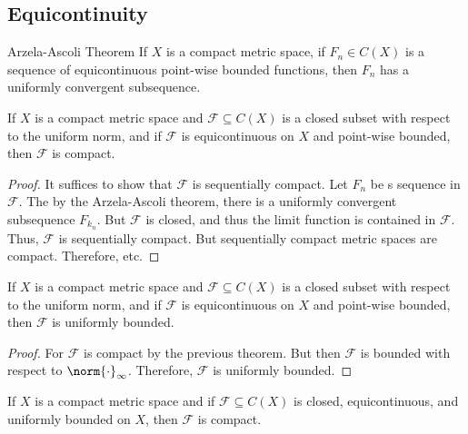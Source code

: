 \documentclass[crop=false,class=book,oneside]{standalone}
\begin{document}
        \subsection{Equicontinuity}
            \begin{ltheorem}{Arzela-Ascoli Theorem}
                If $X$ is a compact metric space, if
                $F_{n}\in{C}(X)$ is a sequence of equicontinuous
                point-wise bounded functions, then $F_{n}$ has a
                uniformly convergent subsequence.
            \end{ltheorem}
            \begin{theorem}
                If $X$ is a compact metric space and
                $\mathscr{F}\subseteq{C}(X)$ is a closed subset with
                respect to the uniform norm, and if
                $\mathscr{F}$ is equicontinuous on $X$ and point-wise
                bounded, then $\mathscr{F}$ is compact.
            \end{theorem}
            \begin{proof}
                It suffices to show that $\mathscr{F}$ is sequentially
                compact. Let $F_{n}$ be s sequence in $\mathscr{F}$.
                The by the Arzela-Ascoli theorem, there is a uniformly
                convergent subsequence $F_{k_{n}}$. But $\mathscr{F}$
                is closed, and thus the limit function is contained
                in $\mathscr{F}$. Thus, $\mathscr{F}$ is sequentially
                compact. But sequentially compact metric spaces are
                compact. Therefore, etc.
            \end{proof}
            \begin{theorem}
                If $X$ is a compact metric space and
                $\mathscr{F}\subseteq{C}(X)$ is a closed subset with
                respect to the uniform norm, and if
                $\mathscr{F}$ is equicontinuous on $X$ and point-wise
                bounded, then $\mathscr{F}$ is uniformly bounded.
            \end{theorem}
            \begin{proof}
                For $\mathscr{F}$ is compact by the previous theorem.
                But then $\mathscr{F}$ is bounded with respect to
                $\norm{\cdot}_{\infty}$. Therefore, $\mathscr{F}$ is
                uniformly bounded.
            \end{proof}
            \begin{theorem}
                If $X$ is a compact metric space and if
                $\mathscr{F}\subseteq{C}(X)$ is closed, equicontinuous,
                and uniformly bounded on $X$, then $\mathscr{F}$ is
                compact.
            \end{theorem}
\end{document}
